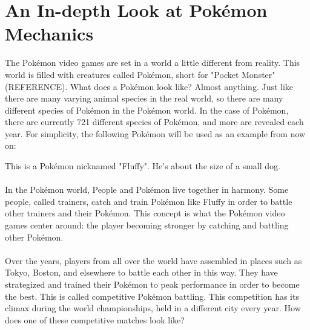 \documentclass{article}
\begin{document}
\section{An In-depth Look at Pok\'emon Mechanics}
The Pok\'emon video games are set in a world a little different from reality. This world is filled with creatures called Pok\'emon, short for "Pocket Monster" (REFERENCE). What does a Pok\'emon look like? Almost anything. Just like there are many varying animal species in the real world, so there are many different species of Pok\'emon in the Pok\'emon world. In the case of Pok\'emon, there are currently 721 different species of Pok\'emon, and more are revealed each year. For simplicity, the following Pok\'emon will be used as an example from now on:
\begin{center}
\end{center}
This is a Pok\'emon nicknamed "Fluffy". He's about the size of a small dog.\\\\
In the Pok\'emon world, People and Pok\'emon live together in harmony. Some people, called trainers, catch and train Pok\'emon like Fluffy in order to battle other trainers and their Pok\'emon. This concept is what the Pok\'emon video games center around: the player becoming stronger by catching and battling other Pok\'emon.\\\\
Over the years, players from all over the world have assembled in places such as Tokyo, Boston, and elsewhere to battle each other in this way. They have strategized and trained their Pok\'emon to peak performance in order to become the best. This is called competitive Pok\'emon battling. This competition has its climax during the world championships, held in a different city every year. How does one of these competitive matches look like?
\end{document}

